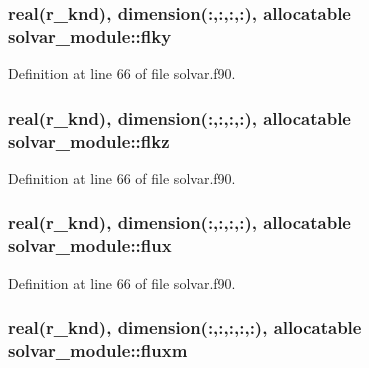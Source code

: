 \hypertarget{classsolvar__module_a3fbb689b872fa887a3ecdd93d9a97ecf}{
\subsubsection[{flky}]{\setlength{\rightskip}{0pt plus 5cm}real(r\-\_\-knd), dimension(\-:,\-:,\-:,\-:), allocatable solvar\-\_\-module\-::flky}}\label{classsolvar__module_a3fbb689b872fa887a3ecdd93d9a97ecf}


Definition at line 66 of file solvar.\-f90.

\hypertarget{classsolvar__module_ac1a71548938a72b9fa42b45c11bca3a1}{
\subsubsection[{flkz}]{\setlength{\rightskip}{0pt plus 5cm}real(r\-\_\-knd), dimension(\-:,\-:,\-:,\-:), allocatable solvar\-\_\-module\-::flkz}}\label{classsolvar__module_ac1a71548938a72b9fa42b45c11bca3a1}


Definition at line 66 of file solvar.\-f90.

\hypertarget{classsolvar__module_acee52bd8211ef05645267a7f4cc9ec28}{
\subsubsection[{flux}]{\setlength{\rightskip}{0pt plus 5cm}real(r\-\_\-knd), dimension(\-:,\-:,\-:,\-:), allocatable solvar\-\_\-module\-::flux}}\label{classsolvar__module_acee52bd8211ef05645267a7f4cc9ec28}


Definition at line 66 of file solvar.\-f90.

\hypertarget{classsolvar__module_a0e9cb7f402640f1adaeeba1ca33718eb}{
\subsubsection[{fluxm}]{\setlength{\rightskip}{0pt plus 5cm}real(r\-\_\-knd), dimension(\-:,\-:,\-:,\-:,\-:), allocatable solvar\-\_\-module\-::fluxm}}\label{classsolvar__module_a0e9cb7f402640f1adaeeba1ca33718eb}


